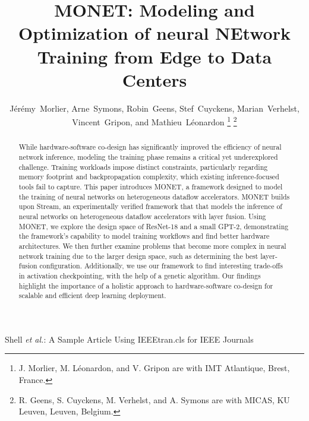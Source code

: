 \documentclass[lettersize,journal]{IEEEtran}
\begin{document}
\title{MONET: Modeling and Optimization of neural NEtwork Training from Edge to Data Centers}

\author{Jérémy~Morlier,
        Arne~Symons,
        Robin~Geens,
        Stef~Cuyckens,
        Marian~Verhelst,
        Vincent~Gripon,
        and Mathieu~Léonardon%
\thanks{J. Morlier, M. Léonardon, and V. Gripon are with IMT Atlantique, Brest, France.}%
\thanks{R. Geens, S. Cuyckens, M. Verhelst, and A. Symons are with MICAS, KU Leuven, Leuven, Belgium.}%
}


%
{Shell \MakeLowercase{\textit{et al.}}: A Sample Article Using IEEEtran.cls for IEEE Journals}


\maketitle

\begin{abstract}
While hardware-software co-design has significantly improved the efficiency of neural network inference, modeling the training phase remains a critical yet underexplored challenge. Training workloads impose distinct constraints, particularly regarding memory footprint and backpropagation complexity, which existing inference-focused tools fail to capture. 
This paper introduces MONET, a framework designed to model the training of neural networks on heterogeneous dataflow accelerators. MONET builds upon Stream, an experimentally verified framework that that models the inference of neural networks on heterogeneous dataflow accelerators with layer fusion. Using MONET, we explore the design space of ResNet-18 and a small GPT-2, demonstrating the framework's capability to model training workflows and find better hardware architectures.
We then further examine problems that become more complex in neural network training due to the larger design space, such as determining the best layer-fusion configuration. Additionally, we use our framework to find interesting trade-offs in activation checkpointing, with the help of a genetic algorithm. Our findings highlight the importance of a holistic approach to hardware-software co-design for scalable and efficient deep learning deployment.
\end{abstract}
\end{document}
